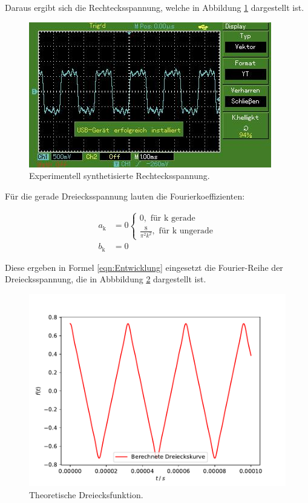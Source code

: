 Daraus ergibt sich die Rechtecksspannung, welche in Abbildung \ref{fig:Ex2}
dargestellt ist.

\begin{figure}[H]
    \centering
    \includegraphics[scale=0.7]{content/recht.jpg}
    \caption{Experimentell synthetisierte Rechtecksspannung.}
    \label{fig:Ex2}
\end{figure}


Für die gerade Dreiecksspannung lauten die Fourierkoeffizienten:

\begin{align*}
    a_\text{k} &= 0 
        \begin{cases} 
            0, \text{ für k gerade} \\ \frac{8}{\pi^2 k^2}, \text{ für k ungerade}
        \end{cases} \\
    b_\text{k} &= 0
\end{align*}

Diese ergeben in Formel \eqref{eqn:Entwicklung} eingesetzt die Fourier-Reihe
der Dreiecksspannung, die in Abbbildung \ref{fig:Theo3}  dargestellt ist.

\begin{figure}[H]
    \centering
    \includegraphics[scale = 0.6]{content/plot6.pdf}
    \caption{Theoretische Dreiecksfunktion.}
    \label{fig:Theo3}
\end{figure}

